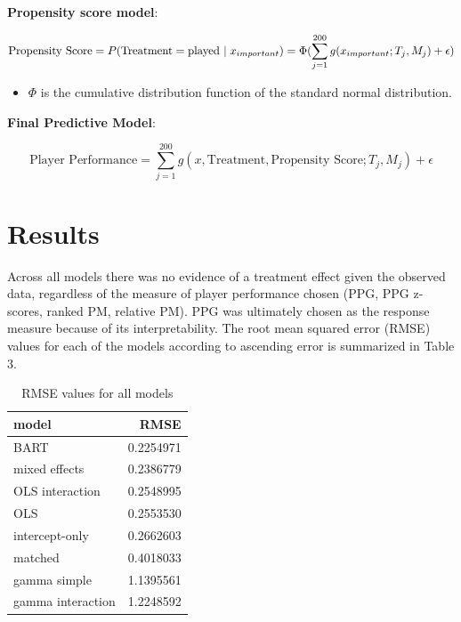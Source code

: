 \documentclass[12pt]{article}
\providecommand{\tightlist}{%
  \setlength{\itemsep}{0pt}\setlength{\parskip}{0pt}}
\begin{document}
\textbf{Propensity score model}:

\vspace{-.5cm}

\[\text{Propensity Score} = P(\text{Treatment} = \text{played } | \hspace{.1cm} x_{important}) = \Phi(\sum_{j=1}^{200} g(x_{important};T_{j}, M_{j}) + \epsilon)\]

\begin{itemize}
\tightlist
\item
  \(\Phi\) is the cumulative distribution function of the standard
  normal distribution.
\end{itemize}

\textbf{Final Predictive Model}:

\[ \text{Player Performance} = \sum_{j=1}^{200} g(x, \text{Treatment}, \text{Propensity Score};T_{j}, M_{j}) + \epsilon\]

\hypertarget{results}{%
\section{Results}\label{results}}

Across all models there was no evidence of a treatment effect given the
observed data, regardless of the measure of player performance chosen
(PPG, PPG z-scores, ranked PM, relative PM). PPG was ultimately chosen
as the response measure because of its interpretability. The root mean
squared error (RMSE) values for each of the models according to
ascending error is summarized in Table 3.

\begin{table}

\caption{\label{Table 3.}RMSE values for all models}
\centering
\begin{tabular}[t]{l|r}
\hline
model & RMSE\\
\hline
BART & 0.2254971\\
\hline
mixed effects & 0.2386779\\
\hline
OLS interaction & 0.2548995\\
\hline
OLS & 0.2553530\\
\hline
intercept-only & 0.2662603\\
\hline
matched & 0.4018033\\
\hline
gamma simple & 1.1395561\\
\hline
gamma interaction & 1.2248592\\
\hline
\end{tabular}
\end{table}
\end{document}
